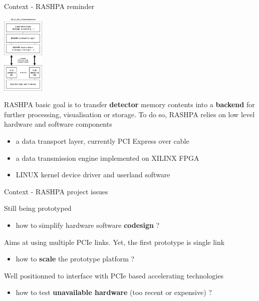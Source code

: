 \documentclass{beamer}
\begin{document}
\begin{frame}{Context - RASHPA reminder}
  \begin{center}
    \includegraphics[width=20mm]{pic/dv_reminder/main.jpeg}
  \end{center}
  \begin{tiny}
  RASHPA basic goal is to transfer \textbf{detector} memory contents into
  a \textbf{backend} for further processing, visualisation or storage. To
  do so, RASHPA relies on low level hardware and software components\\
  \begin{itemize}
  \item a data transport layer, currently PCI Express over cable
  \item a data transmission engine implemented on XILINX FPGA
  \item LINUX kernel device driver and userland software
  \end{itemize}
  \end{tiny}
\end{frame}

\begin{frame}{Context - RASHPA project issues}
  \begin{small}
  Still being prototyped
  \begin{itemize}
  \item how to simplify hardware software \textbf{codesign} ?
  \end{itemize}

  Aims at using multiple PCIe links. Yet, the first prototype is single link
  \begin{itemize}
  \item how to \textbf{scale} the prototype platform ?
  \end{itemize}

  Well positionned to interface with PCIe based accelerating technologies
  \begin{itemize}
  \item how to test \textbf{unavailable hardware} (too recent or expensive) ?
  \end{itemize}
  \end{small}
\end{frame}
\end{document}
